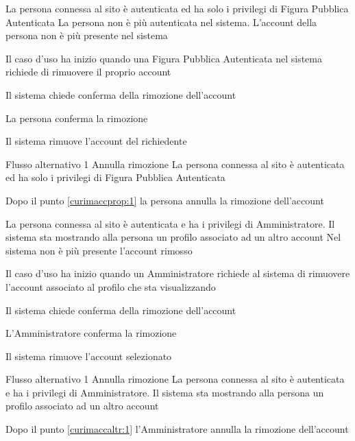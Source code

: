 
{}
{La persona connessa al sito è autenticata ed ha solo i privilegi di Figura Pubblica Autenticata}
{La persona non è più autenticata nel sistema. L'account della persona non è più presente nel sistema}
{\begin{enumCU}
	\item Il caso d'uso ha inizio quando una Figura Pubblica Autenticata nel sistema richiede di rimuovere il proprio account
	\item Il sistema chiede conferma della rimozione dell'account\label{curimaccprop:1}
	\item La persona conferma la rimozione
	\item Il sistema rimuove l'account del richiedente
\end{enumCU}}
%
{Flusso alternativo 1}%
{Annulla rimozione}%
{La persona connessa al sito è autenticata ed ha solo i privilegi di Figura Pubblica Autenticata}%
{\postNulle}%
{\begin{enumCU}
		\item Dopo il punto \ref{curimaccprop:1} la persona annulla la rimozione dell'account
	\end{enumCU}}%


{}
{La persona connessa al sito è autenticata e ha i privilegi di Amministratore. Il sistema sta mostrando alla persona un profilo associato ad un altro account}
{Nel sistema non è più presente l'account rimosso}
{\begin{enumCU}
	\item Il caso d'uso ha inizio quando un Amministratore richiede al sistema di rimuovere l'account associato al profilo che sta visualizzando
	\item Il sistema chiede conferma della rimozione dell'account\label{curimaccaltr:1}
	\item L'Amministratore conferma la rimozione
	\item Il sistema rimuove l'account selezionato
\end{enumCU}}
%
{Flusso alternativo 1}%
{Annulla rimozione}%
{La persona connessa al sito è autenticata e ha i privilegi di Amministratore. Il sistema sta mostrando alla persona un profilo associato ad un altro account}%
{\postNulle}%
{\begin{enumCU}
	\item Dopo il punto \ref{curimaccaltr:1} l'Amministratore annulla la rimozione dell'account
\end{enumCU}}%

